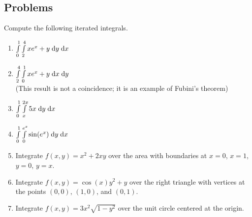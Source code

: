 \documentclass[letterpaper,11pt]{article}
\begin{document}
  \subsection*{Problems}
  Compute the following iterated integrals.

  \begin{enumerate}
    \item $\int \limits_{0}^{1} \int \limits_{2}^{4} x e^{x} + y \;\mathrm{d}y \;\mathrm{d}x$\\
      \newline
      \newline
      \newline
    \item $\int \limits_{2}^{4} \int \limits_{0}^{1} x e^{x} + y \;\mathrm{d}x \;\mathrm{d}y$\\
      (This result is not a coincidence; it is an example of Fubini's theorem)\\
      \newline
      \newline
      \newline
    \item $\int \limits_{0}^{1} \int \limits_{x}^{2 x} 5 x \;\mathrm{d}y \;\mathrm{d}x$\\
      \newline
      \newline
      \newline
    \item $\int \limits_{0}^{1} \int \limits_{0}^{e^{x}} \sin(e^x) \;\mathrm{d}y \;\mathrm{d}x$\\
      \newline
      \newline
      \newline
    \item Integrate $f(x, y) = x^2 + 2 x y$ over the area with boundaries at $x = 0$, $x = 1$, $y = 0$, $y = x$.\\
      \newline
      \newline
      \newline
    \item Integrate $f(x, y) = \cos(x) y^{2} + y$ over the right triangle with vertices at the points $(0, 0)$, $(1, 0)$, and $(0, 1)$.\\
      \newline
      \newline
      \newline
    \item Integrate $f(x, y) = 3 x^2 \sqrt{1 - y^2}$ over the unit circle centered at the origin.\\

\end{enumerate}
\end{document}
